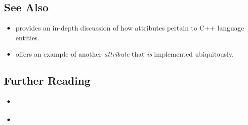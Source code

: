 %

\newpage%
\subsection[See Also]{See Also}\label{see-also}

\begin{itemize}
\item{%
provides an in-depth discussion of how attributes pertain to C++ language entities.}
\item{%
offers an example of another \emph{attribute} that \emph{is} implemented ubiquitously.}
\end{itemize}

\subsection[Further Reading]{Further Reading}\label{further-reading}

\begin{itemize}
\item{\cite{marton17}}
\item{\cite{marton18}}
\end{itemize}


